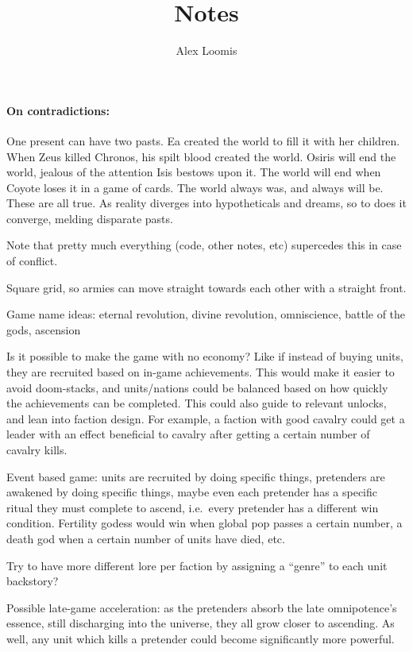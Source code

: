\documentclass[12pt,letterpaper]{article}
\author{Alex Loomis}
\title{Notes}
\begin{document}
\maketitle

\paragraph{On contradictions:}

One present can have two pasts.
Ea created the world to fill it with her children.
When Zeus killed Chronos, his spilt blood created the world.
Osiris will end the world, jealous of the attention Isis bestows upon it.
The world will end when Coyote loses it in a game of cards.
The world always was, and always will be.
These are all true.
As reality diverges into hypotheticals and dreams,
so to does it converge, melding disparate pasts.

\tableofcontents

Note that pretty much everything (code, other notes, etc) supercedes this
in case of conflict.

Square grid, so armies can move straight towards each other with a straight front.

Game name ideas: eternal revolution, divine revolution, omniscience,
battle of the gods, ascension

Is it possible to make the game with no economy?
Like if instead of buying units,
they are recruited based on in-game achievements.
This would make it easier to avoid doom-stacks,
and units/nations could be balanced
based on how quickly the achievements can be completed.
This could also guide to relevant unlocks,
and lean into faction design.
For example, a faction with good cavalry
could get a leader with an effect beneficial to cavalry
after getting a certain number of cavalry kills.

Event based game: units are recruited by doing specific things,
pretenders are awakened by doing specific things,
maybe even each pretender has a specific ritual they must complete to ascend,
i.e.\ every pretender has a different win condition.
Fertility godess would win when global pop passes a certain number,
a death god when a certain number of units have died, etc.

Try to have more different lore per faction
by assigning a ``genre'' to each unit backstory?

Possible late-game acceleration:
as the pretenders absorb
the late omnipotence's essence,
still discharging into the universe,
they all grow closer to ascending.
As well, any unit which kills a pretender
could become significantly more powerful.
\end{document}
